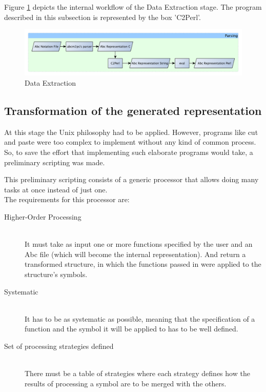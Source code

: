 \documentclass[main.tex]{subfiles}
\begin{document}
Figure \ref{fig:data_extraction} depicts the internal workflow of the Data Extraction stage. The
program described in this subsection is represented by the box 'C2Perl'.

\begin{figure}[htb]
  \centering 
  \includegraphics[width=\textwidth]{img/proof_of_concept_data_extrct.pdf} 
  \caption{Data Extraction}
  \label{fig:data_extraction}
\end{figure}

\subsection{Transformation of the generated representation}

At this stage the Unix philosophy had to be applied. However, programs like cut and paste were too
complex to implement without any kind of common process. So, to save the effort that implementing
such elaborate programs would take, a preliminary scripting was made.

This preliminary scripting consists of a generic processor that allows doing many tasks at once
instead of just one.\\
The requirements for this processor are:
\begin{description}
  \item[Higher-Order Processing] \hfill \\
    It must take as input one or more functions specified by the user and an Abc file (which will
    become the internal representation). And return a transformed structure, in which the functions
    passed in were applied to the structure's symbols.
  \item[Systematic] \hfill \\
    It has to be as systematic as possible, meaning that the specification of a function and the
    symbol it will be applied to has to be well defined.
  \item[Set of processing strategies defined] \hfill \\
    There must be a table of strategies where each strategy defines how the results of processing a
    symbol are to be merged with the others. 
\end{description}
\end{document}
